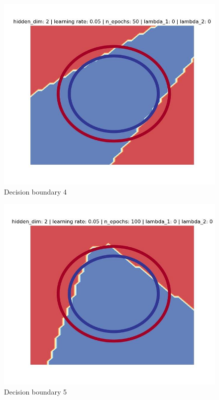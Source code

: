 \documentclass[11pt,english]{article}
\begin{document}
\begin{figure}
	\includegraphics[width=\linewidth]{decision4.jpg}
	\caption{Decision boundary 4}
	\label{fig:boat1}
\end{figure}

\begin{figure}
	\includegraphics[width=\linewidth]{decision5.jpg}
	\caption{Decision boundary 5}
	\label{fig:boat1}
\end{figure}
\end{document}

